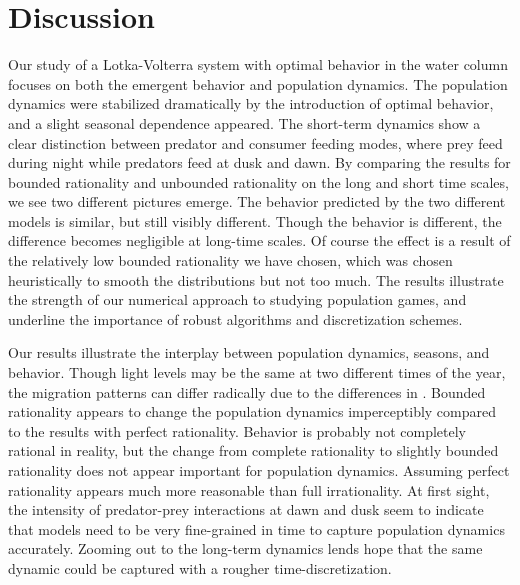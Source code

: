 \section{Discussion}
Our study of a Lotka-Volterra system with optimal behavior in the water column focuses on both the emergent behavior and population dynamics. The population dynamics were stabilized dramatically by the introduction of optimal behavior, and a slight seasonal dependence appeared. The short-term dynamics show a clear distinction between predator and consumer feeding modes, where prey feed during night while predators feed at dusk and dawn. By comparing the results for bounded rationality and unbounded rationality on the long and short time scales, we see two different pictures emerge. The behavior predicted by the two different models is similar, but still visibly different. Though the behavior is different, the difference becomes negligible at long-time scales. Of course the effect is a result of the relatively low bounded rationality we have chosen, which was chosen heuristically to smooth the distributions but not too much. The results illustrate the strength of our numerical approach to studying population games, and underline the importance of robust algorithms and discretization schemes.


Our results illustrate the interplay between population dynamics, seasons, and behavior. Though light levels may be the same at two different times of the year, the migration patterns can differ radically due to the differences in . Bounded rationality appears to change the population dynamics imperceptibly compared to the results with perfect rationality. Behavior is probably not completely rational in reality, but the change from complete rationality to slightly  bounded rationality does not appear important for population dynamics. Assuming perfect rationality appears much more reasonable than full irrationality. At first sight, the intensity of predator-prey interactions at dawn and dusk seem to indicate that models need to be very fine-grained in time to capture population dynamics accurately. Zooming out to the long-term dynamics lends hope that the same dynamic could be captured with a rougher time-discretization.


